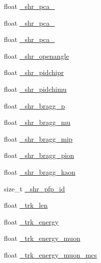 \begin{DoxyCompactItemize}
\item 
float \hyperlink{classselection_1_1CC0piNpSelection_a47b08d4ae98f51032f431873321914a5}{\+\_\+shr\+\_\+pca\+\_}
\item 
float \hyperlink{classselection_1_1CC0piNpSelection_ae3ce85b9e7002cfac57e433ee131868d}{\+\_\+shr\+\_\+pca\+\_}
\item 
float \hyperlink{classselection_1_1CC0piNpSelection_a7e5a1ac6cd32eec7da00eb45c49df0cd}{\+\_\+shr\+\_\+pca\+\_}
\item 
float \hyperlink{classselection_1_1CC0piNpSelection_a33b26acb3cdb05cb1b81800d8af48a03}{\+\_\+shr\+\_\+openangle}
\item 
float \hyperlink{classselection_1_1CC0piNpSelection_aae9294d7e4803ff991e611ea124769bc}{\+\_\+shr\+\_\+pidchipr}
\item 
float \hyperlink{classselection_1_1CC0piNpSelection_a63840908c268c89d30e6728ac6cb1036}{\+\_\+shr\+\_\+pidchimu}
\item 
float \hyperlink{classselection_1_1CC0piNpSelection_acb447ca93f046abd1540291ba0d41e73}{\+\_\+shr\+\_\+bragg\+\_\+p}
\item 
float \hyperlink{classselection_1_1CC0piNpSelection_a6ef67d022fce5058985773010161b7cb}{\+\_\+shr\+\_\+bragg\+\_\+mu}
\item 
float \hyperlink{classselection_1_1CC0piNpSelection_ae18587d33433c508bd3e371de8db7b32}{\+\_\+shr\+\_\+bragg\+\_\+mip}
\item 
float \hyperlink{classselection_1_1CC0piNpSelection_afa97d9a456bf2255e06c6c5226f25929}{\+\_\+shr\+\_\+bragg\+\_\+pion}
\item 
float \hyperlink{classselection_1_1CC0piNpSelection_a0fae2cdec5a695421cbe2fdfe6e61c9d}{\+\_\+shr\+\_\+bragg\+\_\+kaon}
\item 
size\+\_\+t \hyperlink{classselection_1_1CC0piNpSelection_a21f98860ef8bd0ad8d8e029a47ef6f1e}{\+\_\+shr\+\_\+pfp\+\_\+id}
\item 
float \hyperlink{classselection_1_1CC0piNpSelection_aab7945993678b44d7100abac6cc71655}{\+\_\+trk\+\_\+len}
\item 
float \hyperlink{classselection_1_1CC0piNpSelection_a98e03f33f34b5df397a1d1144b1de4a1}{\+\_\+trk\+\_\+energy}
\item 
float \hyperlink{classselection_1_1CC0piNpSelection_aabcb2e3b6df63f077fc37d881c1794a3}{\+\_\+trk\+\_\+energy\+\_\+muon}
\item 
float \hyperlink{classselection_1_1CC0piNpSelection_a4ae8946bcc37ce152c81ba3c28d60fbb}{\+\_\+trk\+\_\+energy\+\_\+muon\+\_\+mcs}

\end{DoxyCompactItemize}
